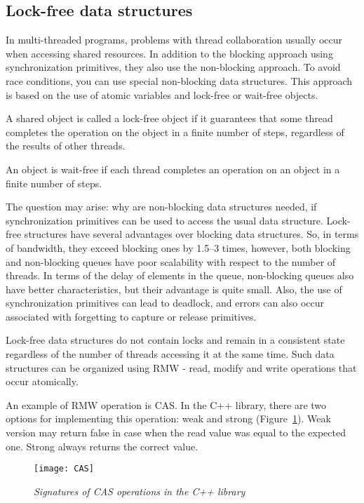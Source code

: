 { %
	\subsection{Lock-free data structures}
	\label{lockfree:section}
	\par In multi-threaded programs, problems with thread collaboration usually occur when accessing shared resources. In addition to the blocking approach using synchronization primitives, they also use the non-blocking approach. To avoid race conditions, you can use special non-blocking data structures. This approach is based on the use of atomic variables and lock-free or wait-free objects.
	\par A shared object is called a lock-free object if it guarantees that some thread completes the operation on the object in a finite number of steps, regardless of the results of other threads.
	\par An object is wait-free if each thread completes an operation on an object in a finite number of steps.
	\par The question may arise: why are non-blocking data structures needed, if synchronization primitives can be used to access the usual data structure. Lock-free structures have several advantages over blocking data structures. So, in terms of bandwidth, they exceed blocking ones by 1.5–3 times, however, both blocking and non-blocking queues have poor scalability with respect to the number of threads. In terms of the delay of elements in the queue, non-blocking queues also have better characteristics, but their advantage is quite small. Also, the use of synchronization primitives can lead to deadlock, and errors can also occur associated with forgetting to capture or release primitives.
	\par Lock-free data structures do not contain locks and remain in a consistent state regardless of the number of threads accessing it at the same time. Such data structures can be organized using RMW - read, modify and write operations that occur atomically.
	\par An example of RMW operation is CAS. In the C++ library, there are two options for implementing this operation: weak and strong (Figure~\ref{CAS:image}). Weak version may return false in case when the read value was equal to the expected one. Strong always returns the correct value.
	\begin{figure}[H]
		\texttt{[image: CAS]}
		\caption{\textit{Signatures of CAS operations in the C++ library}}
		\label{CAS:image}

\end{figure}}
